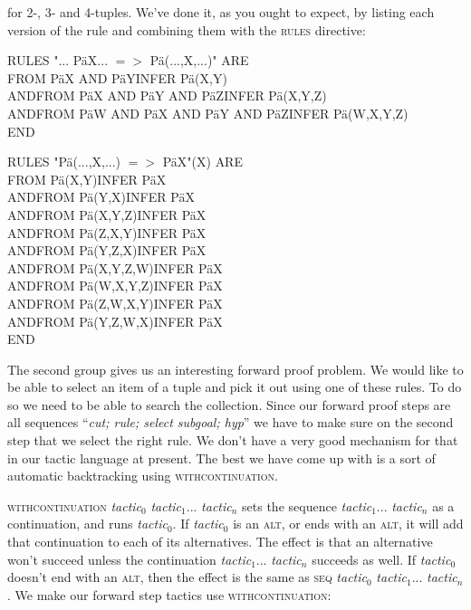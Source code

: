 \documentclass[11pt]{book}
\newcommand{\tab}{\hspace{5mm}}
\begin{document}
for 2-, 3- and 4-tuples. We've done it, as you ought to expect, by listing each version of the rule and combining them with the \textsc{rules} directive:

RULES "... P\"{a}X... $=>$ P\"{a}(...,X,...)" ARE\\
\tab FROM P\"{a}X AND P\"{a}Y\tab INFER P\"{a}(X,Y) \\
AND\tab FROM P\"{a}X AND P\"{a}Y AND P\"{a}Z\tab INFER P\"{a}(X,Y,Z) \\
AND\tab FROM P\"{a}W AND P\"{a}X AND P\"{a}Y AND P\"{a}Z\tab INFER P\"{a}(W,X,Y,Z)\\
END

RULES "P\"{a}(...,X,...) $=>$ P\"{a}X"(X) ARE \\
\tab FROM P\"{a}(X,Y)\tab INFER P\"{a}X \\
AND\tab FROM P\"{a}(Y,X)\tab INFER P\"{a}X \\
AND\tab FROM P\"{a}(X,Y,Z)\tab INFER P\"{a}X \\
AND\tab FROM P\"{a}(Z,X,Y)\tab INFER P\"{a}X \\
AND\tab FROM P\"{a}(Y,Z,X)\tab INFER P\"{a}X \\
AND\tab FROM P\"{a}(X,Y,Z,W)\tab INFER P\"{a}X \\
AND\tab FROM P\"{a}(W,X,Y,Z)\tab INFER P\"{a}X \\
AND\tab FROM P\"{a}(Z,W,X,Y)\tab INFER P\"{a}X \\
AND\tab FROM P\"{a}(Y,Z,W,X)\tab INFER P\"{a}X\\
END


The second group gives us an interesting forward proof problem. We would like to be able to select an item of a tuple and pick it out using one of these rules. To do so we need to be able to search the collection. Since our forward proof steps are all sequences ``\textit{cut; rule; select subgoal; hyp}'' we have to make sure on the second step that we select the right rule. We don't have a very good mechanism for that in our tactic language at present. The best we have come up with is a sort of automatic backtracking using \textsc{withcontinuation}.


\textsc{withcontinuation} \textit{tactic}$_{0}$ \textit{tactic}$_{1}$... \textit{tactic}$_{\textit{n}}$ sets the sequence \textit{tactic}$_{1}$... \textit{tactic}$_{\textit{n}}$ as a continuation, and runs \textit{tactic}$_{0}$. If \textit{tactic}$_{0}$ is an \textsc{alt}, or ends with an \textsc{alt}, it will add that continuation to each of its alternatives. The effect is that an alternative won't succeed unless the continuation \textit{tactic}$_{1}$... \textit{tactic}$_{\textit{n}}$ succeeds as well. If \textit{tactic}$_{0}$ doesn't end with an \textsc{alt}, then the effect is the same as \textsc{seq} \textit{tactic}$_{0}$ \textit{tactic}$_{1}$... \textit{tactic}$_{\textit{n}}$. We make our forward step tactics use \textsc{withcontinuation}:
\end{document}
